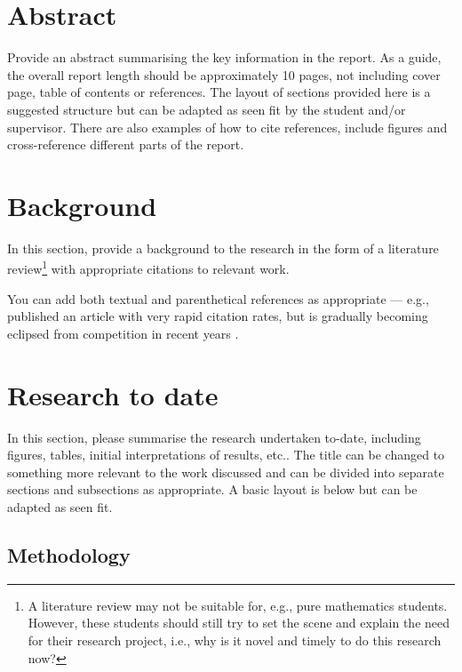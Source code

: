\documentclass{article}
\begin{document}


\chapter*{Abstract}

Provide an abstract summarising the key information in the report.  As a guide, the overall report length should be approximately 10 pages, not including cover page, table of contents or references.  The layout of sections provided here is a suggested structure but can be adapted as seen fit by the student and/or supervisor.  There are also examples of how to cite references, include figures and cross-reference different parts of the report.

\chapter{Background}
In this section, provide a background to the research in the form of a literature review\footnote{A literature review may not be suitable for, e.g., pure mathematics students. However, these students should still try to set the scene and explain the need for their research project, i.e., why is it novel and timely to do this research now?} with appropriate citations to relevant work.

You can add both textual and parenthetical references as appropriate --- e.g., \citet{2012PhLB..716....1A} published an article with very rapid citation rates, but is gradually becoming eclipsed from competition in recent years \citep[e.g.,][to name but a few]{2018Natur.556...43C, 2018PhRvD..98c0001T, 2019ApJ...873..111I}.

\chapter{Research to date}
In this section, please summarise the research undertaken to-date, including figures, tables, initial interpretations of results, etc..  The title can be changed to something more relevant to the work discussed and can be divided into separate sections and subsections as appropriate.  A basic layout is below but can be adapted as seen fit.

\section{Methodology}
\end{document}
